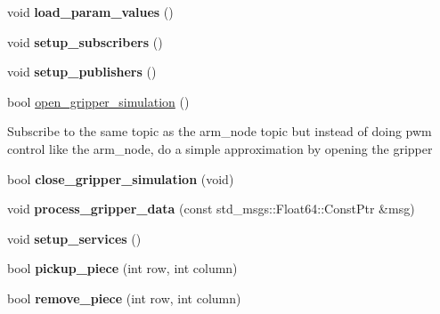 \begin{DoxyCompactItemize}
void {\bfseries load\+\_\+param\+\_\+values} ()
\item 
\mbox{\label{classgo__motion__planner_a49672ad780c9c66c554672b2ecf8bd78}} 
void {\bfseries setup\+\_\+subscribers} ()
\item 
\mbox{\label{classgo__motion__planner_ac994e145558bda267ac29ea6feb9981a}} 
void {\bfseries setup\+\_\+publishers} ()
\item 
\mbox{\label{classgo__motion__planner_a9248ea5b2727f984761ea7bbaea3ba5c}} 
bool \hyperlink{classgo__motion__planner_a9248ea5b2727f984761ea7bbaea3ba5c}{open\+\_\+gripper\+\_\+simulation} ()
\begin{DoxyCompactList}\small\item\em 
\begin{DoxyItemize}
\item Subscribe to the same topic as the arm\+\_\+node topic but instead of doing pwm control like the arm\+\_\+node, do a simple approximation by opening the gripper 
\end{DoxyItemize}\end{DoxyCompactList}\item 
\mbox{\label{classgo__motion__planner_aed6123e33622ebff3b420479e1fd6141}} 
bool {\bfseries close\+\_\+gripper\+\_\+simulation} (void)
\item 
\mbox{\label{classgo__motion__planner_a7b79595d9f86b059309f73ca16969c34}} 
void {\bfseries process\+\_\+gripper\+\_\+data} (const std\+\_\+msgs\+::\+Float64\+::\+Const\+Ptr \&msg)
\item 
\mbox{\label{classgo__motion__planner_a9a27e25a326f322f6c4c766029ed081d}} 
void {\bfseries setup\+\_\+services} ()
\item 
\mbox{\label{classgo__motion__planner_acda1c3562a9863181f4dbd1deaff3ff3}} 
bool {\bfseries pickup\+\_\+piece} (int row, int column)
\item 
\mbox{\label{classgo__motion__planner_a29c727d02a06b13b39e907384c71eb1e}} 
bool {\bfseries remove\+\_\+piece} (int row, int column)

\end{DoxyCompactItemize}
